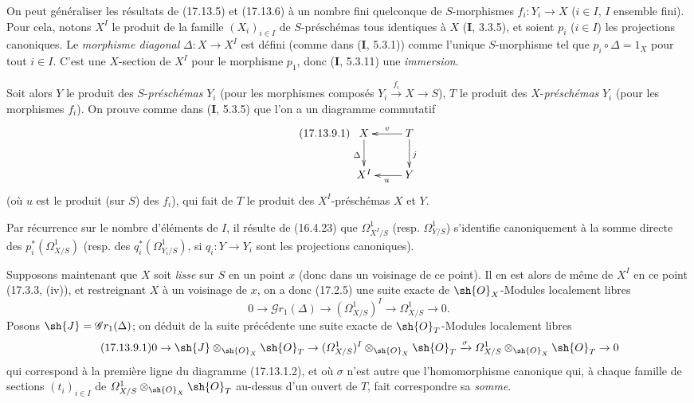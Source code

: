 \begin{env}[17.13.9]
\label{IV.17.13.9}
On peut généraliser les résultats de (17.13.5) et (17.13.6) à un nombre fini quelconque de $S$-morphismes $f_i:Y_i\to X$ ($i\in I$, $I$ ensemble fini). Pour cela, notons $X^I$ le produit de la famille $(X_i)_{i\in I}$ de $S$-préschémas tous identiques à $X$ (\textbf{I}, 3.3.5), et soient $p_i$ ($i\in I$) les projections canoniques. Le \emph{morphisme diagonal} $\Delta:X\to X^I$ est défini (comme dans (\textbf{I}, 5.3.1)) comme l'unique $S$-morphisme tel que $p_i\circ\Delta=1_X$ pour tout $i\in I$. C'est une $X$-section de $X^I$ pour le morphisme $p_1$, donc (\textbf{I}, 5.3.11) une \emph{immersion}.


Soit alors $Y$ le produit des $S$-\emph{préschémas} $Y_i$ (pour les morphismes composés $Y_i\xrightarrow{f_i}X\to S$), $T$ le produit des $X$-\emph{préschémas} $Y_i$ (pour les morphismes $f_i$). On prouve comme dans (\textbf{I}, 5.3.5) que l'on a un diagramme commutatif
\[
\label{IV.17.13.9.1}
\tag{17.13.9.1}
\xymatrix{
  X \ar[d]_{\Delta} & T \ar[l]_-v \ar[d]^{j}\\
  X^I & Y \ar[l]^{u}
}
\]
(où $u$ est le produit (sur $S$) des $f_i$), qui fait de $T$ le produit des $X^I$-préschémas $X$ et $Y$.

Par récurrence sur le nombre d'éléments de $I$, il résulte de (16.4.23) que $\varOmega^1_{X^I/S}$ (resp. $\varOmega^1_{Y/S}$) s'identifie canoniquement à la somme directe des $p_i^*(\varOmega^1_{X/S})$ (resp. des $q_i^*(\varOmega^1_{Y_i/S})$, si $q_i:Y\to Y_i$ sont les projections canoniques).

Supposons maintenant que $X$ soit \emph{lisse} sur $S$ en un point $x$ (donc dans un voisinage de ce point). Il en est alors de même de $X^I$ en ce point (17.3.3, (iv)), et restreignant $X$ à un voisinage de $x$, on a donc (17.2.5) une suite exacte de $\sh{O}_X$-Modules localement libres
\[
0\to\mathscr{G}r_1(\Delta)\to(\varOmega^1_{X/S})^I\to\varOmega^1_{X/S}\to0.
\]
Posons $\sh{J}=\mathscr{G}r_1(\Delta)$; on déduit de la suite précédente une suite exacte de $\sh{O}_T$-Modules localement libres
\[
\label{IV.17.13.9.1-seq}
\tag{17.13.9.1}
0\to\sh{J}\otimes_{\sh{O}_X}\sh{O}_T\to(\varOmega^1_{X/S})^I\otimes_{\sh{O}_X}\sh{O}_T\xrightarrow{\sigma}\varOmega^1_{X/S}\otimes_{\sh{O}_X}\sh{O}_T\to0
\]
qui correspond à la première ligne du diagramme (17.13.1.2), et où $\sigma$ n'est autre que l'homomorphisme canonique qui, à chaque famille de sections $(t_i)_{i\in I}$ de $\varOmega^1_{X/S}\otimes_{\sh{O}_X}\sh{O}_T$ au-dessus d'un ouvert de $T$, fait correspondre sa \emph{somme}.


\end{env}

